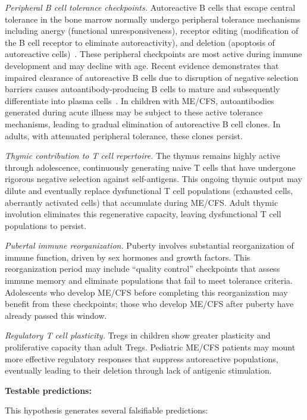 \begin{hypothesis}
\textit{Peripheral B cell tolerance checkpoints.} Autoreactive B cells that escape central tolerance in the bone marrow normally undergo peripheral tolerance mechanisms including anergy (functional unresponsiveness), receptor editing (modification of the B cell receptor to eliminate autoreactivity), and deletion (apoptosis of autoreactive cells)~\cite{JExpMed2024bcell,FrontImmunol2024thymic}. These peripheral checkpoints are most active during immune development and may decline with age. Recent evidence demonstrates that impaired clearance of autoreactive B cells due to disruption of negative selection barriers causes autoantibody-producing B cells to mature and subsequently differentiate into plasma cells~\cite{JExpMed2024bcell}. In children with ME/CFS, autoantibodies generated during acute illness may be subject to these active tolerance mechanisms, leading to gradual elimination of autoreactive B cell clones. In adults, with attenuated peripheral tolerance, these clones persist.

\textit{Thymic contribution to T cell repertoire.} The thymus remains highly active through adolescence, continuously generating naive T cells that have undergone rigorous negative selection against self-antigens. This ongoing thymic output may dilute and eventually replace dysfunctional T cell populations (exhausted cells, aberrantly activated cells) that accumulate during ME/CFS. Adult thymic involution eliminates this regenerative capacity, leaving dysfunctional T cell populations to persist.

\textit{Pubertal immune reorganization.} Puberty involves substantial reorganization of immune function, driven by sex hormones and growth factors. This reorganization period may include ``quality control'' checkpoints that assess immune memory and eliminate populations that fail to meet tolerance criteria. Adolescents who develop ME/CFS before completing this reorganization may benefit from these checkpoints; those who develop ME/CFS after puberty have already passed this window.

\textit{Regulatory T cell plasticity.} Tregs in children show greater plasticity and proliferative capacity than adult Tregs. Pediatric ME/CFS patients may mount more effective regulatory responses that suppress autoreactive populations, eventually leading to their deletion through lack of antigenic stimulation.

\textbf{Testable predictions:}

This hypothesis generates several falsifiable predictions:


\end{hypothesis}

